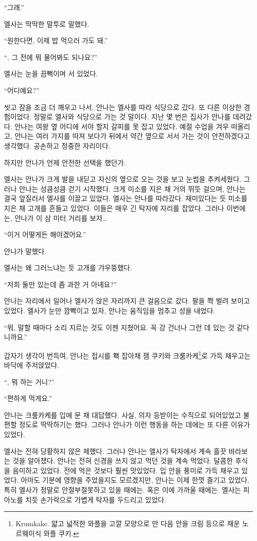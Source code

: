 ``그래.''

엘사는 딱딱한 말투로 말했다.

``원한다면, 이제 밥 먹으러 가도 돼.''

``, 그 전에 뭐 물어봐도 되나요?''

엘사는 눈을 끔뻑이며 서 있었다.

`` 어디예요?''

\textbreak

씻고 잠을 조금 더 깨우고 나서, 안나는 엘사를 따라 식당으로 갔다. 또 다른 이상한 경험이었다. 정말로 엘사와 식당으로 가는 것 말이다. 지난 몇 번은 집사가 안나를 데려갔다. 안나는 여왕 옆 어디에 서야 할지 갈피를 못 잡고 있었다. 예절 수업을 겨우 떠올리고, 안나는 여러 가지를 따져 보다가 뒤에서 약간 옆으로 서서 가는 것이 안전하겠다고 생각했다. 공손하고 정중한 자리이다.

하지만 안나가 언제 안전한 선택을 했던가.

엘사는 안나가 크게 발을 내딛고 자신의 옆으로 오는 것을 보고 눈썹을 추켜세웠다. 그러나 안나는 성큼성큼 걷기 시작했다. 크게 미소를 지은 채 거의 뛰듯 걸으며, 안나는 결국 앞질러서 엘사를 이끌고 있었다. 엘사는 안나를 따라갔다. 재미있다는 듯 미소를 지은 채 고개를 흔들고 있었다. 이들은 매우 긴 탁자에 자리를 잡았다. 그러나 이번에는, 안나가 이 삼 미터 거리를 보자\ldots

``이거 어떻게든 해야겠어요.''

안나가 말했다.

엘사는 왜 그러느냐는 듯 고개를 갸우뚱했다.

``저희 둘만 있는데 좀 과한 거 아녜요?''

안나는 자리에서 일어나 엘사가 앉은 자리까지 큰 걸음으로 갔다. 팔을 쫙 벌려 보이고 있었다. 엘사가 눈만 깜빡이고 있자, 안나는 움직임을 멈추고 성을 내었다.

``뭐, 말할 때마다 소리 지르는 것도 이젠 지쳤어요. 꼭 강 건너나 그런 데 있는 것 같다니까요.''

갑자기 생각이 번득여, 안나는 접시를 홱 잡아채 잼 쿠키와 크룸카케\footnote{Krumkake. 얇고 넓적한 와플을 고깔 모양으로 만 다음 안을 크림 등으로 채운 노르웨이식 와플 쿠키.}로 가득 채우고는 바닥에 주저앉았다.

``, 뭐 하는 거니?''

``편하게 먹게요.''

안나는 크룸카케를 입에 문 채 대답했다. 사실, 의자 등받이는 수직으로 되어있었고 불편할 정도로 딱딱하기는 했다. 그러나 안나가 이런 행동을 하는 데에는 또 다른 이유가 있었다.

엘사는 전혀 당황하지 않은 체했다. 그러나 안나는 엘사가 탁자에서 계속 흘끗 바라보는 것을 알아챘다. 안나는 전혀 신경을 쓰지 않고 먹던 것을 계속 먹었다. 달콤한 후식을 음미하고 있었다. 전에 먹은 것보다 훨씬 맛있었다. 입 안을 풍미로 가득 채우고 있었다. 아마도 기분에 영향을 주었을지도 모르겠지만, 안나는 이제 한껏 즐기고 있었다. 특히 엘사가 정말로 안절부절못하고 있을 때에는. 혹은 이에 가까울 때에는. 엘사는 피아노를 치듯 손가락으로 가볍게 탁자를 두드리고 있었다.


